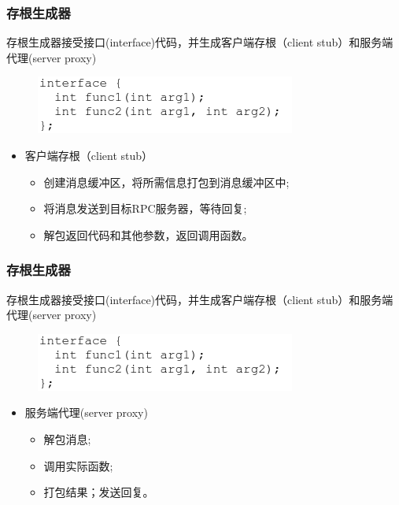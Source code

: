 \begin{frame}[fragile]
    \frametitle{存根生成器}
存根生成器接受接口(interface)代码，并生成客户端存根（client stub）和服务端代理(server proxy)
    
        \begin{figure}
            \includegraphics[width=0.6\linewidth]{figs/rpc-interface.png}
        \end{figure}

    \begin{itemize}
        \item 客户端存根（client stub）
        \begin{itemize}
            \item 创建消息缓冲区，将所需信息打包到消息缓冲区中;
            \item 将消息发送到目标RPC服务器，等待回复;
            \item 解包返回代码和其他参数，返回调用函数。
        \end{itemize}
    \end{itemize}
    
\end{frame}

\begin{frame}[fragile]
    \frametitle{存根生成器}
存根生成器接受接口(interface)代码，并生成客户端存根（client stub）和服务端代理(server proxy)
    
    \begin{figure}
        \includegraphics[width=0.6\linewidth]{figs/rpc-interface.png}
    \end{figure}
    \begin{itemize}
        \item 服务端代理(server proxy)
        \begin{itemize}
            \item 解包消息;
            \item 调用实际函数;
            \item 打包结果；发送回复。
        \end{itemize}
    \end{itemize}
    
\end{frame}

